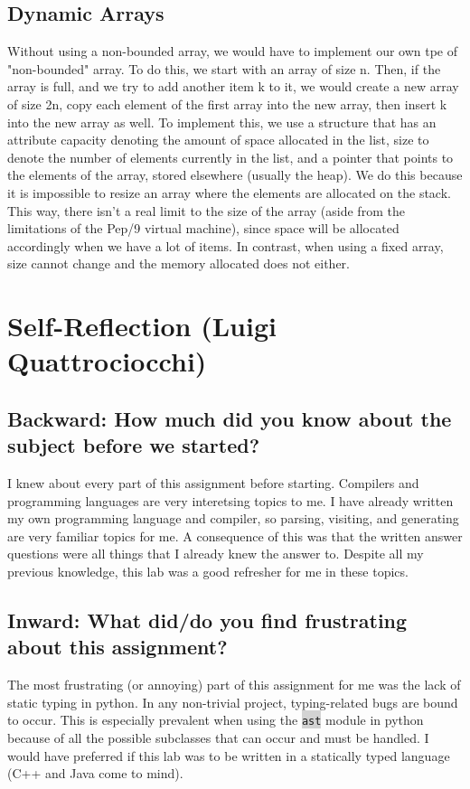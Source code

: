 \documentclass[12pt]{article}
\newcommand{\code}[1]{\colorbox{LightGray}{\texttt{#1}}}
\begin{document}
\subsection*{Dynamic Arrays}
Without using a non-bounded array, we would have to implement our own tpe of "non-bounded" array. To do this, we start with an array of size n. Then, if the array is full, and we try to add another item k to it, we would create a new array of size 2n, copy each element of the first array into the new array, then insert k into the new array as well. To implement this, we use a structure that has an attribute capacity denoting the amount of space allocated in the list, size to denote the number of elements currently in the list, and a pointer that points to the elements of the array, stored elsewhere (usually the heap). We do this because it is impossible to resize an array where the elements are allocated on the stack. This way, there isn't a real limit to the size of the array (aside from the limitations of the Pep/9 virtual machine), since space will be allocated accordingly when we have a lot of items. In contrast, when using a fixed array, size cannot change and the memory allocated does not either.

\pagebreak

\section*{Self-Reflection (Luigi Quattrociocchi)}
\subsection*{Backward: How much did you know about the subject before we started?}
I knew about every part of this assignment before starting. Compilers and programming languages are very interetsing topics to me. I have already written my own programming language and compiler, so parsing, visiting, and generating are very familiar topics for me. A consequence of this was that the written answer questions were all things that I already knew the answer to. Despite all my previous knowledge, this lab was a good refresher for me in these topics.

\subsection*{Inward: What did/do you find frustrating about this assignment?}
The most frustrating (or annoying) part of this assignment for me was the lack of static typing in python. In any non-trivial project, typing-related bugs are bound to occur. This is especially prevalent when using the \code{ast} module in python because of all the possible subclasses that can occur and must be handled. I would have preferred if this lab was to be written in a statically typed language (C++ and Java come to mind).
\end{document}

